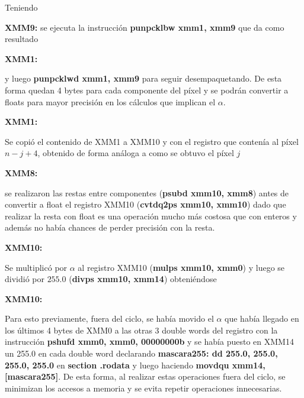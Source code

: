 Teniendo
\par{\textbf{XMM9:}}
se ejecuta la instrucción \textbf{punpcklbw xmm1, xmm9} que da como resultado
\par{\textbf{XMM1:}}
\par{y luego \textbf{punpcklwd xmm1, xmm9} para seguir desempaquetando. De esta forma quedan 4 bytes para cada componente del píxel y se podrán convertir a floats para mayor precisión en los cálculos que implican el $\alpha$.}
\par{\textbf{XMM1:}}
\par{Se copió el contenido de XMM1 a XMM10 y con el registro que contenía al píxel $n-j+4$, obtenido de forma análoga a como se obtuvo el píxel $j$}
\par{\textbf{XMM8:}}
\par{se realizaron las restas entre componentes (\textbf{psubd xmm10, xmm8}) antes de convertir a float el registro XMM10 (\textbf{cvtdq2ps xmm10, xmm10}) dado que realizar la resta con float es una operación mucho más costosa que con enteros y además no había chances de perder precisión con la resta.}
\par{\textbf{XMM10:}}
\par{Se multiplicó por $\alpha$ al registro XMM10 (\textbf{mulps xmm10, xmm0}) y luego se dividió por $255.0$ (\textbf{divps xmm10, xmm14}) obteniéndose}
\par{\textbf{XMM10:}}
\par{Para esto previamente, fuera del ciclo, se había movido el $\alpha$ que había llegado en los últimos 4 bytes de XMM0 a las otras 3 double words del registro con la instrucción \textbf{pshufd xmm0, xmm0, 00000000b} y se había puesto en XMM14 un 255.0 en cada double word declarando \textbf{mascara255: dd 255.0, 255.0, 255.0, 255.0} en \textbf{section .rodata} y luego haciendo \textbf{movdqu xmm14, [mascara255]}. De esta forma, al realizar estas operaciones fuera del ciclo, se minimizan los accesos a memoria y se evita repetir operaciones innecesarias.}

